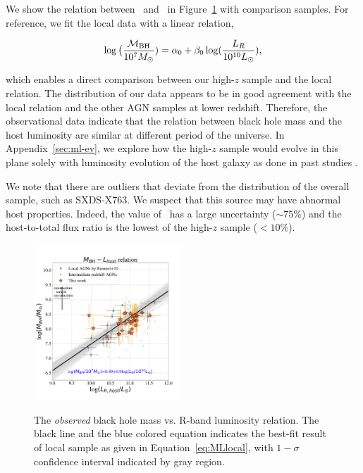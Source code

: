 \documentclass[apj]{emulateapj}
\begin{document}
We show the relation between \mbh\ and \lhost\ in Figure~\ref{fig:ML} with comparison samples. For reference, we fit the local data with a linear relation,

\begin{eqnarray}
\label{eq:MLlocal}
\log \big( \frac{\mathcal M_{\rm BH}}{10^{7}M_{\odot}})= \alpha_0 + \beta_0 \log(\frac{L_R}{10^{10}L_{\odot}}),
\end {eqnarray}

\noindent which enables a direct comparison between our high-$z$ sample and the local relation. The distribution of our data appears to be in good agreement with the local relation and the other AGN samples at lower redshift. Therefore, the observational data indicate that the relation between black hole mass and the host luminosity are similar at different period of the universe. In Appendix~\ref{sec:ml-ev}, we explore how the high-$z$  sample would evolve in this plane solely with luminosity evolution of the host galaxy as done in past studies \citep[e.g., ][]{Ding2017b}. 

We note that there are outliers that deviate from the distribution of the overall sample, such as SXDS-X763. We suspect that this source may have abnormal host properties. Indeed, the value of \Reff\ has a large uncertainty ($\sim 75\%$) and the host-to-total flux ratio is the lowest of the high-$z$ sample ($<10\%$). 





\begin{figure}
\centering
{\includegraphics[width=0.5\textwidth]{fig/MBH-L_obs.pdf}}
\caption{\label{fig:ML} 
The {\it observed} black hole mass vs. R-band luminosity relation. The black line and the blue colored equation indicates the best-fit result of local sample as given in Equation~\ref{eq:MLlocal}, with $1-\sigma$ confidence interval indicated by gray region.
}
\end{figure} 
\end{document}
